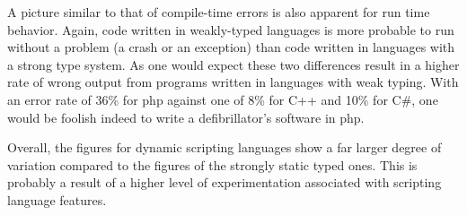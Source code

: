 \documentclass[10pt]{sigplanconf}
\begin{document}
A picture similar to that of compile-time errors
is also apparent for run time behavior.
Again, code written in weakly-typed languages is more probable to run without
a problem (a crash or an exception)
than code written in languages with a strong type system.
As one would expect these two differences result in a higher rate of
wrong output from programs written in languages with weak typing.
With an error rate of 36\% for {\sc php} against one of 8\% for
C++ and 10\% for C\#, one would be foolish indeed to write a defibrillator's
software in {\sc php}.

Overall, the figures for dynamic scripting languages show a far larger
degree of variation compared to the figures of the strongly static typed
ones.
This is probably a result of a higher level of experimentation
associated with scripting language features.
\end{document}
